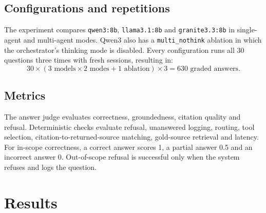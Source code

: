 \documentclass[11pt,a4paper]{article}
\begin{document}
\subsection{Configurations and repetitions}
The experiment compares \texttt{qwen3:8b}, \texttt{llama3.1:8b} and \texttt{granite3.3:8b} in single-agent and multi-agent modes. Qwen3 also has a \texttt{multi\_nothink} ablation in which the orchestrator's thinking mode is disabled. Every configuration runs all 30 questions three times with fresh sessions, resulting in:
\[
30 \times (3 \text{ models} \times 2 \text{ modes} + 1 \text{ ablation}) \times 3
= 630 \text{ graded answers}.
\]

\subsection{Metrics}
The answer judge evaluates correctness, groundedness, citation quality and refusal. Deterministic checks evaluate refusal, unanswered logging, routing, tool selection, citation-to-returned-source matching, gold-source retrieval and latency. For in-scope correctness, a correct answer scores 1, a partial answer 0.5 and an incorrect answer 0. Out-of-scope refusal is successful only when the system refuses and logs the question.

\section{Results}
\label{sec:results}
\end{document}
